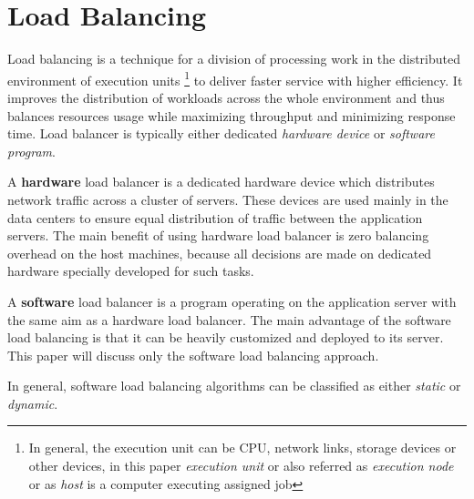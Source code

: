 \section{Load Balancing}\label{sec:load-balancing}
Load balancing is a technique for a division of processing work in the distributed environment of execution units
\footnote{In general, the execution unit can be CPU, network links, storage devices or other devices,
in this paper \textit{execution unit} or also referred as \textit{execution node} or as \textit{host} is a computer executing assigned job}
to deliver faster service with higher efficiency.
It improves the distribution of workloads across the whole environment and thus balances resources usage while maximizing throughput and minimizing response time.
Load balancer is typically either dedicated \textit{hardware device} or \textit{software program}.

A \textbf{hardware} load balancer is a dedicated hardware device which distributes network traffic across a cluster of servers\cite{web:hardwareLoadBalancer}.
These devices are used mainly in the data centers to ensure equal distribution of traffic between the application servers.
The main benefit of using hardware load balancer is zero balancing overhead on the host machines,
because all decisions are made on dedicated hardware specially developed for such tasks.

A \textbf{software} load balancer is a program operating on the application server with the same aim as a hardware load balancer.
The main advantage of the software load balancing is that it can be heavily customized and deployed to its server.
This paper will discuss only the software load balancing approach.

\medskip
\noindent In general, software load balancing algorithms can be classified as either \textit{static} or \textit{dynamic}.

